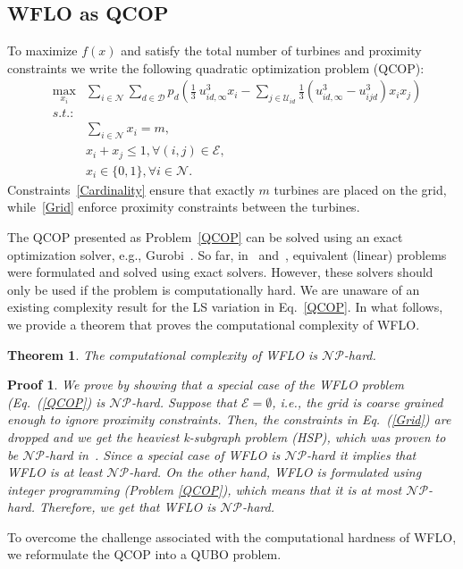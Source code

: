 \documentclass[preprint,12pt]{elsarticle}
\newtheorem{mythm}{Theorem}
\newtheorem{myproof}{Proof}
\begin{document}
\subsection{WFLO as QCOP}

To 
maximize $f(x)$ and satisfy the total number of turbines and proximity 
constraints we write
the following quadratic optimization problem (QCOP):
\begin{eqnarray} \label{QCOP}
&\max_{x_i}^{}& \sum_{i \in \mathcal{N}}^{} \sum_{d \in \mathcal{D}}^{} p_d ( \frac{1}{3} \ u_{id, \infty}^3 x_i  - \sum_{j \in \mathcal{U}_{id}}^{} \frac{1}{3}(u_{id, \infty} ^3 - u_{ijd}^3)x_i x_j)   \\
&s.t.:& \nonumber\\
&\mbox{       }& \sum_{i \in \mathcal{N}}^{} x_i = m,\label{Cardinality}\\
&\mbox{       }& x_i + x_j \leq 1,   \forall (i,j) \in \mathcal{E}, \label{Grid}\\
&\mbox{       }& x_i \in \{0,1\},     \forall i \in \mathcal{N}.
\end{eqnarray} Constraints~\ref{Cardinality} ensure that exactly $m$ turbines are placed on the grid, while~\ref{Grid}
enforce proximity constraints between the turbines. 

The QCOP presented as Problem~\ref{QCOP} can be solved using an exact optimization solver, e.g., Gurobi~\cite{gurobi}. 
So far, in~\cite{Zhang2014} and~\cite{donovan2005wind}, equivalent (linear) problems were formulated and solved using 
exact solvers. However, these solvers should only be used if the problem is computationally hard.
We are unaware of an existing complexity result for the LS variation in Eq.~\ref{QCOP}. In what follows, we provide
a theorem that proves the computational complexity of WFLO. 
\begin{mythm}
	The computational complexity of WFLO is $\mathcal{NP}$-hard. 
\end{mythm}
\begin{myproof}
We prove by showing that a special case of the WFLO problem (Eq.~(\ref{QCOP}) is
$\mathcal{NP}$-hard. Suppose that $\mathcal{E} = \emptyset$, i.e., the grid is coarse grained enough to ignore proximity constraints. Then, the constraints in Eq.~(\ref{Grid})
are dropped and we get the heaviest k-subgraph problem (HSP), which was proven to be $\mathcal{NP}$-hard in~\cite{billionnet2005different}.
Since a special case of WFLO is  $\mathcal{NP}$-hard it implies that WFLO is at least $\mathcal{NP}$-hard. On the other hand,
WFLO is formulated using integer programming (Problem \ref{QCOP}), which means that it is at most $\mathcal{NP}$-hard. Therefore, we get that WFLO is $\mathcal{NP}$-hard.
	\end{myproof} To overcome the challenge associated with the computational hardness of WFLO,
we reformulate the QCOP into a QUBO problem.  
\end{document}
